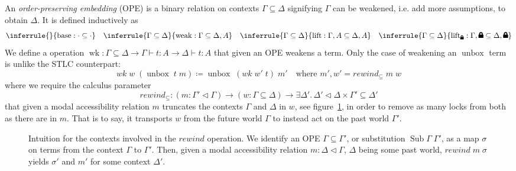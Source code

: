 \documentclass[12pt,twoside,openright]{report}
\numberwithin{equation}{chapter}
\numberwithin{figure}{chapter}
\numberwithin{table}{chapter}
\theoremstyle{definition}\newtheorem{definition}{Definition}
\newcommand{\lock}{\text{\tikz[baseline]{
      \fill[rounded corners=.1ex] (-.75ex,0) rectangle (.75ex,1ex);
      \draw[line width=.3ex] (-.4ex,.5ex) -- ++(0,.75ex) arc (180:0:.4ex) -- ++(0,-.75ex);
}}}
\begin{document}
An \emph{order-preserving embedding} (OPE) is a binary relation on contexts $\Gamma \subseteq \Delta$
signifying $\Gamma$ can be weakened, i.e. add more assumptions,
to obtain $\Delta$.
It is defined inductively as
\begin{equation*}
  \inferrule{ }{\operatorname{base} : \cdot \subseteq \cdot} \quad
  \inferrule{\Gamma \subseteq \Delta}{\operatorname{weak} : \Gamma \subseteq \Delta, A} \quad
  \inferrule{\Gamma \subseteq \Delta}{\operatorname{lift} : \Gamma, A \subseteq \Delta, A} \quad
  \inferrule{\Gamma \subseteq \Delta}{\operatorname{lift}_\lock : \Gamma, \lock \subseteq \Delta, \lock}
\end{equation*}
We define a operation
$\operatorname{wk} : \Gamma\subseteq\Delta \to \Gamma \vdash t : A \to \Delta \vdash t : A$
that given an OPE weakens a term.
Only the case of weakening an $\operatorname{unbox}$ term is unlike the STLC counterpart:
$$ \textit{wk} \; w \; (\operatorname{unbox} \; t \; m) \coloneqq \operatorname{unbox} \; (\textit{wk} \; w' \; t) \; m' \quad \text{where } m' , w' = \textit{rewind}_\subseteq \; m \; w $$
where we require the calculus parameter
$$ \textit{rewind}_\subseteq : (m : \Gamma'\lhd\Gamma) \to (w : \Gamma\subseteq\Delta) \to \exists \Delta'. \, \Delta'\lhd\Delta \times \Gamma'\subseteq\Delta' $$
that given a modal accessibility relation $m$
truncates the contexts $\Gamma$ and $\Delta$ in $w$,
see figure~\ref{fig:rewind},
in order to remove as many locks from both as there are in $m$.
That is to say, it transports $w$ from the future world $\Gamma$ to instead act on the past world $\Gamma'$.

\begin{figure}
  \centering
  \caption{Intuition for the contexts involved in the $\textit{rewind}$ operation.
    We identify an OPE $\Gamma \subseteq \Gamma'$,
    or substitution $\operatorname{Sub} \Gamma \; \Gamma'$,
    as a map $\sigma$ on terms from the context $\Gamma$ to $\Gamma'$.
    Then, given a modal accessibility relation $m : \Delta \lhd \Gamma$,
    $\Delta$ being some past world,
    $\textit{rewind} \; m \; \sigma$ yields $\sigma'$ and $m'$
    for some context $\Delta'$.
    \label{fig:rewind}}
\end{figure}
\end{document}
